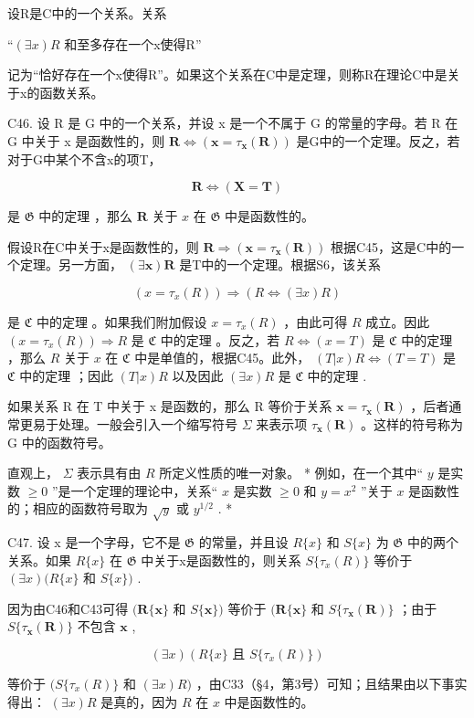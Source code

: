 设R是C中的一个关系。关系

``\((\exists x)R\) 和至多存在一个x使得R''

记为“恰好存在一个x使得R”。如果这个关系在C中是定理，则称R在理论C中是关于x的函数关系。

C46. 设 R 是 G 中的一个关系，并设 x 是一个不属于 G 的常量的字母。若 R 在 G 中关于 x 是函数性的，则 \(\mathbf{R} \Longleftrightarrow (\mathbf{x} = \tau_{\mathbf{x}}(\mathbf{R}))\) 是G中的一个定理。反之，若对于G中某个不含x的项T，

\[
\boldsymbol {R} \Longleftrightarrow (\boldsymbol {X} = \boldsymbol {T})
\]

是 \(\mathfrak{G}\) 中的定理 ，那么 \(\pmb{R}\) 关于 \(x\) 在 \(\mathfrak{G}\) 中是函数性的。

假设R在C中关于x是函数性的，则 \(\boldsymbol{R} \Longrightarrow (\boldsymbol{x} = \tau_{\boldsymbol{x}}(\boldsymbol{R}))\) 根据C45，这是C中的一个定理。另一方面， \((\exists \boldsymbol{x})\boldsymbol{R}\) 是T中的一个定理。根据S6，该关系

\[
(x = \tau_ {x} (R)) \Longrightarrow (R \Longleftrightarrow (\exists x) R)
\]

是 \(\mathfrak{C}\) 中的定理 。如果我们附加假设 \(x = \tau_x(R)\) ，由此可得 \(R\) 成立。因此 \((x = \tau_x(R)) \Longrightarrow R\) 是 \(\mathfrak{C}\) 中的定理 。反之，若 \(R \Longleftrightarrow (x = T)\) 是 \(\mathfrak{C}\) 中的定理 ，那么 \(R\) 关于 \(x\) 在 \(\mathfrak{C}\) 中是单值的，根据C45。此外， \((T|x)R \Longleftrightarrow (T = T)\) 是 \(\mathfrak{C}\) 中的定理 ；因此 \((T|x)R\) 以及因此 \((\exists x)R\) 是 \(\mathfrak{C}\) 中的定理 .

如果关系 R 在 T 中关于 x 是函数的，那么 R 等价于关系 \(\boldsymbol{x} = \tau_{\boldsymbol{x}}(\boldsymbol{R})\) ，后者通常更易于处理。一般会引入一个缩写符号 \(\Sigma\) 来表示项 \(\tau_{\boldsymbol{x}}(\boldsymbol{R})\) 。这样的符号称为 G 中的函数符号。

直观上， \(\Sigma\) 表示具有由 \(R\) 所定义性质的唯一对象。 * 例如，在一个其中“ \(y\) 是实数 \(\geqslant 0\) ''是一个定理的理论中，关系“ \(x\) 是实数 \(\geqslant 0\) 和 \(y = x^{2}\) ”关于 \(x\) 是函数性的；相应的函数符号取为 \(\sqrt{y}\) 或 \(y^{1/2}\) . *

C47. 设 x 是一个字母，它不是 \(\mathfrak{G}\) 的常量，并且设 \(R\{x\}\) 和 \(S\{x\}\) 为 \(\mathfrak{G}\) 中的两个关系。如果 \(R\{x\}\) 在 \(\mathfrak{G}\) 中关于x是函数性的，则关系 \(S\{\tau_{x}(R)\}\) 等价于 \((\exists x)(R\{x\}\) 和 \(S\{x\})\) .

因为由C46和C43可得 \((\pmb{R}\{\pmb{x}\}\) 和 \(S\{\pmb{x}\})\) 等价于 \((\pmb{R}\{\pmb{x}\}\) 和 \(S\{\tau_{\pmb{x}}(\pmb{R})\}\) ；由于 \(S\{\tau_{\pmb{x}}(\pmb{R})\}\) 不包含 \(\pmb{x}\) ,

\[
(\exists x) (R \{x \} \text {   且   } S \{\tau_ {x} (R) \})
\]

等价于 \((S\{\tau_x(R)\}\) 和 \((\exists x)R)\) ，由C33（§4，第3号）可知；且结果由以下事实得出： \((\exists x)R\) 是真的，因为 \(R\) 在 \(x\) 中是函数性的。

\clearpage
